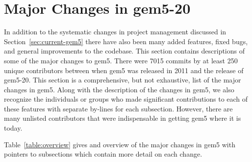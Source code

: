 \section{Major Changes in gem5-20}
\label{sec:changes}

In addition to the systematic changes in project management discussed in Section~\ref{sec:current-gem5} there have also been many added features, fixed bugs, and general improvements to the codebase.
This section contains descriptions of some of the major changes to gem5.
There were 7015 commits by at least 250 unique contributors between when gem5 was released in 2011 and the release of gem5-20.
This section is a comprehensive, but not exhaustive, list of the major changes in gem5.
Along with the description of the changes in gem5, we also recognize the individuals or groups who made significant contributions to each of these features with separate by-lines for each subsection.
However, there are many unlisted contributors that were indispensable in getting gem5 where it is today.

Table~\ref{table:overview} gives and overview of the major changes in gem5 with pointers to subsections which contain more detail on each change.

